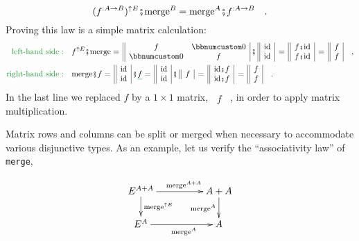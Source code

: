 ~\vspace{-0.3\baselineskip}
\[
(f^{:A\rightarrow B})^{\uparrow E}\bef\text{merge}^{B}=\text{merge}^{A}\bef f^{:A\rightarrow B}\quad.
\]
Proving this law is a simple matrix calculation:
\begin{align*}
{\color{greenunder}\text{left-hand side}:}\quad & f^{\uparrow E}\bef\text{merge}=\,\begin{array}{||cc|}
f & \bbnum 0\\
\bbnum 0 & f
\end{array}\,\bef\,\begin{array}{||c|}
\text{id}\\
\text{id}
\end{array}\,=\,\begin{array}{||c|}
f\bef\text{id}\\
f\bef\text{id}
\end{array}\,=\,\begin{array}{||c|}
f\\
f
\end{array}\quad,\\
{\color{greenunder}\text{right-hand side}:}\quad & \text{merge}\bef f=\,\begin{array}{||c|}
\text{id}\\
\text{id}
\end{array}\,\bef\gunderline f=\,\begin{array}{||c|}
\text{id}\\
\text{id}
\end{array}\,\bef\,\begin{array}{||c|}
f\end{array}\,=\,\begin{array}{||c|}
\text{id}\bef f\\
\text{id}\bef f
\end{array}\,=\,\begin{array}{||c|}
f\\
f
\end{array}\quad.
\end{align*}
In the last line we replaced $f$ by a $1\times1$ matrix, $\,\begin{array}{||c|}
f\end{array}$~, in order to apply matrix multiplication.

Matrix rows and columns can be split or merged when necessary to accommodate
various disjunctive types. As an example, let us verify the \textsf{``}associativity
law\textsf{''} of \lstinline!merge!,

\begin{wrapfigure}{L}{0.3\columnwidth}%
\vspace{-2\baselineskip}
\[
\xymatrix{\xyScaleY{1.6pc}\xyScaleX{4.0pc}E^{A+A}\ar[d]\sp(0.45){\text{merge}^{\uparrow E}}\ar[r]\sp(0.55){\text{merge}^{A+A}} & A+A\ar[d]\sb(0.5){\text{merge}^{A}}\\
E^{A}\ar[r]\sb(0.55){\text{merge}^{A}} & A
}
\]
\vspace{-0.1\baselineskip}
\end{wrapfigure}%

